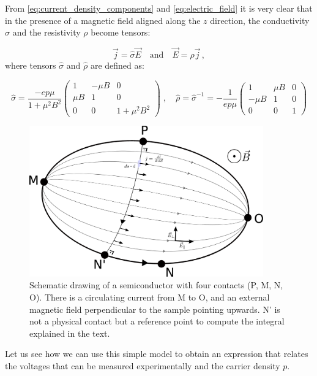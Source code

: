\documentclass[11pt,a4paper]{article}
\begin{document}
From \eqref{eq:current_density_components} and \eqref{eq:electric_field} it is very clear that in the presence of a magnetic field aligned along the $z$ direction, the conductivity $\sigma$ and the resistivity $\rho$ become tensors:

\begin{equation*}
\vec{j}=\hat{\sigma}\vec{E}\quad\text{and}\quad\vec{E}=\hat{\rho}\vec{j}\,,
\end{equation*}
where tensors $\hat{\sigma}$ and $\hat{\rho}$ are defined as:

\begin{equation}\label{eq:resistivity_tensor}
\hat{\sigma}=
\frac{-ep\mu}{1+\mu^2B^2}
\begin{pmatrix}
1 & -\mu B & 0 \\
\mu B & 1 & 0 \\
0 & 0 & 1+\mu^2B^2
\end{pmatrix}\;,\quad
\hat{\rho}=\hat{\sigma}^{-1}=
-\frac{1}{ep\mu}
\begin{pmatrix}
1 & \mu B & 0 \\
-\mu B & 1 & 0 \\
0 & 0 & 1
\end{pmatrix}
\end{equation}

\begin{figure}[ht]
\centering
\includegraphics[width=0.9\textwidth]{Drawing.eps}
\caption{Schematic drawing of a semiconductor with four contacts (P, M, N, O). There is a circulating current from M to O, and an external magnetic field perpendicular to the sample pointing upwards. N' is not a physical contact but a reference point to compute the integral explained in the text.}
\label{fig:sample}
\end{figure}

Let us see how we can use this simple model to obtain an expression that relates the voltages that can be measured experimentally and the carrier density $p$.
\end{document}

